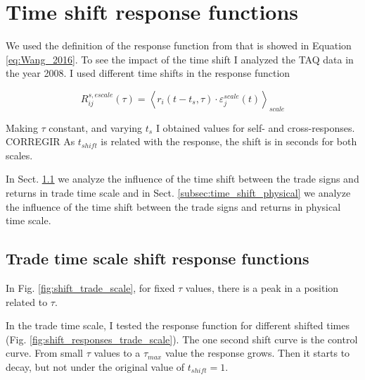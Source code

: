 \section{Time shift response functions}\label{sec:time_shift}

We used the definition of the response function from \cite{Wang_2016_cross} that
is showed in Equation \ref{eq:Wang_2016}. To see the impact of the time shift I
analyzed the TAQ data in the year 2008. I used different time shifts in the
response function

\begin{equation}\label{eq:time_shift_general}
    R_{ij}^{s, escale}\left(\tau\right)=\left\langle r_{i}
    \left(t-t_{s},\tau\right) \cdot\varepsilon^{scale}_{j}
    \left(t\right)\right\rangle _{scale}
\end{equation}

Making $\tau$ constant, and varying $t_{s}$ I obtained values for self- and
cross-responses. CORREGIR As $t_{shift}$ is related with the response, the shift is in
seconds for both scales.

In Sect. \ref{subsec:time_shift_trade} we analyze the influence of the time
shift between the trade signs and returns in trade time scale and in Sect.
\ref{subsec:time_shift_physical} we analyze the influence of the time shift
between the trade signs and returns in physical time scale.

\subsection{Trade time scale shift response functions}
\label{subsec:time_shift_trade}

In Fig. \ref{fig:shift_trade_scale}, for fixed $\tau$ values, there is a peak
in a position related to $\tau$.

In the trade time scale, I tested the response function for different shifted
times (Fig. \ref{fig:shift_responses_trade_scale}). The one second shift curve
is the control curve. From small $\tau$ values to a $\tau_{max}$ value the
response grows. Then it starts to decay, but not under the original value of
$t_{shift} = 1$.


